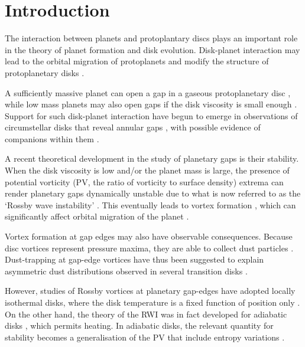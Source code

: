 \documentclass[useAMS,usenatbib]{mn2e}
\begin{document}
\section{Introduction}\label{intro}
The interaction between planets and protoplantary discs plays an
important role in the theory of planet formation and disk 
evolution. Disk-planet interaction may lead to the orbital migration
of protoplanets and modify the structure of
protoplanetary disks  \citep[see][for a recent review]{baruteau13}.  

A sufficiently massive planet can open a gap in a 
gaseous protoplanetary disc \citep{pap_lin84,bryden99,crida06,fung14}, 
while low mass planets may also open gaps if the disk viscosity is
small enough \citep{li09,dong11,duffell13}. Support for such disk-planet
interaction have begun to emerge in observations of circumstellar
disks that reveal annular gaps
\citep[e.g.][]{quanz13a,debes13,osorio14}, with possible evidence of
companions within them \citep[e.g.][]{quanz13b,reggiani14}. 


A recent theoretical development in the study of planetary gaps is
their stability. When the disk viscosity is low and/or the planet mass
is large, the presence of potential vorticity (PV, the ratio of
vorticity to surface density) extrema can render planetary gaps
dynamically unstable due to what is now referred to as the `Rossby
wave instability' \citep[RWI,][]{lovelace99,li00}. This 
eventually leads to vortex formation 
\citep{li01,koller03,li05,valborro07}, which can significantly affect
orbital migration of the planet  \citep{ou07,li09,lin10}. 

Vortex formation at gap edges may also have observable 
consequences. Because disc vortices represent pressure maxima, they are
able to collect dust particles 
\citep{barge95,inaba06,lyra13}. Dust-trapping at gap-edge vortices
have thus been suggested to explain asymmetric dust
distributions observed in several transition disks
\citep[e.g][]{marel13,isella13,perez14}. 

However, studies of Rossby vortices at planetary gap-edges have 
adopted locally isothermal disks, %
where the disk temperature is a fixed function of
position only \citep[e.g.][]{lyra08,lin11a,zhu14,fu14}. 
On the other hand, the theory of the RWI was in fact
developed for adiabatic disks \citep{li00}, which permits
heating. %
In adiabatic disks, the relevant quantity for stability
becomes a generalisation of the PV that include entropy variations
\citep{lovelace99}.   
\end{document}
